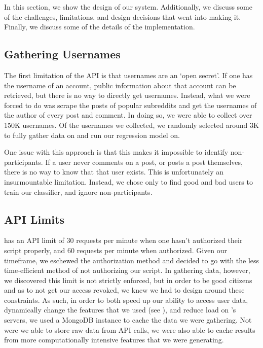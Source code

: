 In this section, we show the design of our system. Additionally, we discuss some
of the challenges, limitations, and design decisions that went into making it.
Finally, we discuss some of the details of the implementation.

\subsection{Gathering \reddit{} Usernames} %
\label{sub:gathering_reddit_usernames}

The first limitation of the \reddit{} API is that usernames are an `open
secret'. If one has the username of an account, public information about that
account can be retrieved, but there is no way to directly get usernames.
Instead, what we were forced to do was scrape the posts of popular subreddits
and get the usernames of the author of every post and comment. In doing so, we
were able to collect over 150K usernames. Of the usernames we collected, we
randomly selected around 3K to fully gather data on and run our regression model
on.

One issue with this approach is that this makes it impossible to identify non-
participants. If a user never comments on a post, or posts a post themselves,
there is no way to know that that user exists. This is unfortunately an
insurmountable limitation. Instead, we chose only to find good and bad users to
train our classifier, and ignore non-participants.


\subsection{\reddit{} API Limits} %
\label{sub:reddit_api_limits}

\reddit{} has an API limit of 30 requests per minute when one hasn't authorized
their script properly, and 60 requests per minute when authorized. Given our
timeframe, we eschewed the authorization method and decided to go with the less
time-efficient method of not authorizing our script. In gathering data, however,
we discovered this limit is not strictly enforced, but in order to be good
citizens and as to not get our access revoked, we knew we had to design around
these constraints. As such, in order to both speed up our ability to access user
data, dynamically change the features that we used (see
), and reduce load on \reddit{}'s servers, we used a
MongoDB instance to cache the data we were gathering. Not were we able to store
raw data from \reddit{} API calls, we were also able to cache results from more
computationally intensive features that we were generating.

